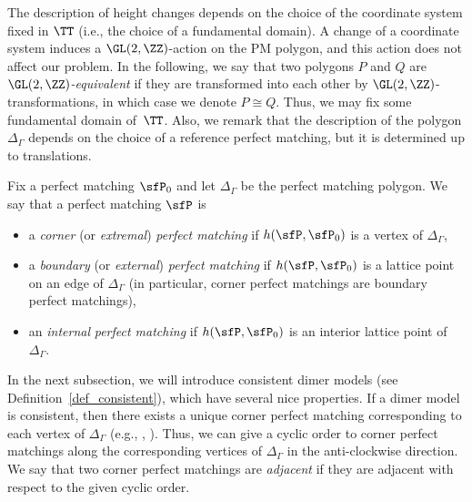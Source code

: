 \begin{Remark}\label{rem_polygon}
The description of height changes depends on the choice of the coordinate system fixed in $\TT$
(i.e., the choice of a fundamental domain).
A change of a coordinate system induces a $\GL(2,\ZZ)$-action on the PM polygon, and this action does not affect our problem.
In the following, we say that two polygons $P$ and $Q$ are \emph{$\GL(2,\ZZ)$-equivalent} if they are transformed into each other by $\GL(2,\ZZ)$-transformations, in which case we denote $P\cong Q$.
Thus, we may fix some fundamental domain of~$\TT$.
Also, we remark that the description of the polygon $\Delta_\Gamma$ depends on the choice of a reference perfect matching, but it is determined up to translations.
\end{Remark}

\begin{Definition}\label{def_corner}
Fix a perfect matching $\sfP_0$ and let $\Delta_\Gamma$ be the perfect matching polygon.
We say that a perfect matching $\sfP$ is
\begin{itemize}\itemsep=0pt
\item a \emph{corner} (or \emph{extremal}) \emph{perfect matching} if $h(\sfP,\sfP_0)$ is a vertex of $\Delta_\Gamma$,
\item a \emph{boundary} (or \emph{external}) \emph{perfect matching} if $h(\sfP,\sfP_0)$ is a lattice point on an edge of $\Delta_\Gamma$
(in particular, corner perfect matchings are boundary perfect matchings),
\item an \emph{internal} \emph{perfect matching} if $h(\sfP,\sfP_0)$ is an interior lattice point of $\Delta_\Gamma$.
\end{itemize}
\end{Definition}

In the next subsection, we will introduce consistent dimer models (see Definition~\ref{def_consistent}), which have several nice properties.
If a dimer model is consistent, then there exists a unique corner perfect matching corresponding to each vertex of $\Delta_\Gamma$
(e.g., \cite[Corollary~4.27]{Bro}, \cite[Proposition~9.2]{IU2}).
Thus, we can give a cyclic order to corner perfect matchings along the corresponding vertices of $\Delta_\Gamma$ in the anti-clockwise direction.
We say that two corner perfect matchings are \emph{adjacent} if they are adjacent with respect to the given cyclic order.

